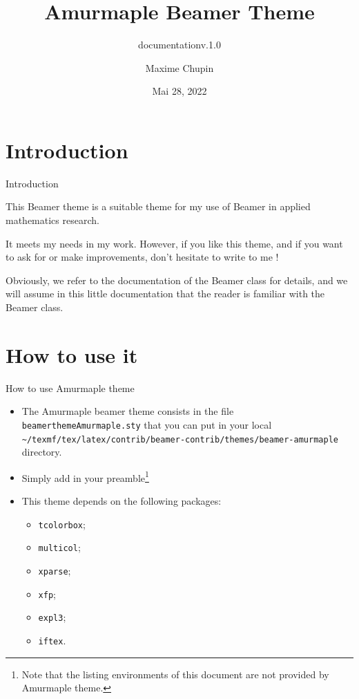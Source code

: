 \documentclass[10pt,aspectratio=169,english]{beamer}
\title[Amurmaple documentation]{Amurmaple Beamer Theme}
\author[M.~Chupin]{Maxime Chupin}
\subtitle{documentation\quad v.1.0}
\institute[CNRS]{CNRS\\
University of Paris-Dauphine}
\date{Mai 28, 2022}
\begin{document}
\maketitle

\sepframe[title={Table of contents}]
\section{Introduction}

\begin{frame}{Introduction}
\begin{information}
This Beamer theme is  a suitable theme for my use of Beamer in applied
mathematics research.

It meets my needs in my work. However, if you like this theme, and if you want
to ask for or make improvements, don't hesitate to write to me !

Obviously, we refer to the documentation of the Beamer class for details, and we
will assume in this little documentation that the reader is familiar with the
Beamer class.
\end{information}

\end{frame}


\section{How to use it}

\sepframe

\begin{frame}[fragile]{How to use Amurmaple theme}
  \begin{itemize}
  \item The Amurmaple beamer theme consists in the file
    \texttt{beamerthemeAmurmaple.sty} that you can put in your local
    \texttt{\~{}/texmf/tex/latex/contrib/beamer-contrib/themes/beamer-amurmaple}
    directory.
  \item Simply add in your preamble\footnote{Note that the listing environments
      of this document are not provided by Amurmaple theme.}
\item This theme depends on the following packages:
  \begin{multicols}{2}
  \begin{itemize}
  \item \lstinline+tcolorbox+;
  \item \lstinline+multicol+;
  \item \lstinline+xparse+;
  \item \lstinline+xfp+;
  \item \lstinline+expl3+;
  \item \lstinline+iftex+.
  \end{itemize}
\end{multicols}
\end{itemize}
\end{frame}
\end{document}

